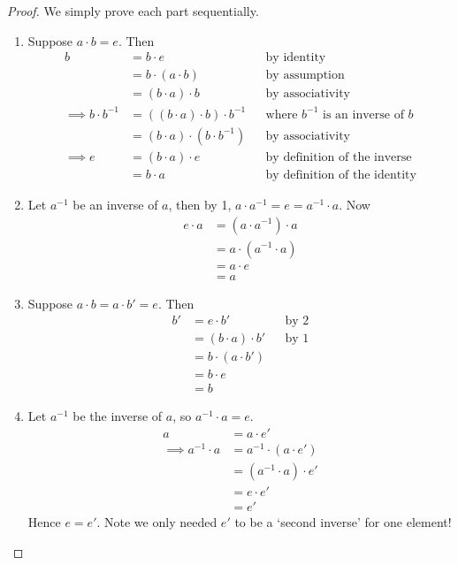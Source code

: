 \documentclass{../../template/note}
\begin{document}
    \begin{proof}
        We simply prove each part sequentially.
        \begin{enumerate}
            \item Suppose \(a \cdot b = e\). Then
            \begin{align*}
                b &= b \cdot e && \text{by identity} \\
                &= b \cdot (a \cdot b) && \text{by assumption} \\
                &= (b \cdot a) \cdot b && \text{by associativity} \\
                \implies b \cdot b^{-1} &= ((b \cdot a ) \cdot b) \cdot b^{-1} && \text{where \(b^{-1}\) is an inverse of \(b\)} \\
                &= (b \cdot a) \cdot (b \cdot b^{-1}) && \text{by associativity} \\
                \implies e &= (b \cdot a) \cdot e && \text{by definition of the inverse} \\
                &= b \cdot a && \text{by definition of the identity}
            \end{align*}
            \item Let \(a^{-1}\) be an inverse of \(a\), then by 1, \(a \cdot a^{-1} = e = a^{-1} \cdot a\). Now
            \begin{align*}
                e \cdot a &= (a \cdot a^{-1}) \cdot a \\
                &= a \cdot (a^{-1} \cdot a) \\
                &= a \cdot e \\
                &= a
            \end{align*}
            \item Suppose \(a \cdot b = a \cdot b' = e\). Then
            \begin{align*}
                b' &= e \cdot b' && \text{by 2} \\
                &= (b \cdot a) \cdot b' && \text{by 1} \\
                &= b \cdot (a \cdot b') \\
                &= b \cdot e \\
                &= b
            \end{align*}
            \item Let \(a^{-1}\) be the inverse of \(a\), so \(a^{-1} \cdot a = e\).
            \begin{align*}
                a &= a \cdot e' \\
                \implies a^{-1} \cdot a &= a^{-1} \cdot (a \cdot e') \\
                &= (a^{-1} \cdot a) \cdot e' \\
                &= e \cdot e' \\
                &= e'
            \end{align*}
            Hence \(e = e'\). Note we only needed \(e'\) to be a `second inverse' for one element!
        \end{enumerate}
    \end{proof}
    
\end{document}
